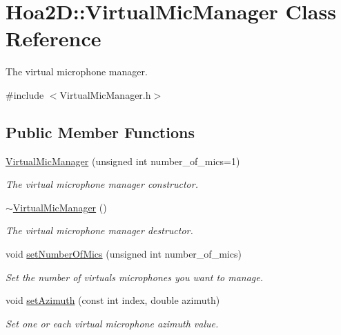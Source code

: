 \hypertarget{class_hoa2_d_1_1_virtual_mic_manager}{\section{Hoa2\-D\-:\-:Virtual\-Mic\-Manager Class Reference}
\label{class_hoa2_d_1_1_virtual_mic_manager}
}


The virtual microphone manager.  




{\ttfamily \#include $<$Virtual\-Mic\-Manager.\-h$>$}

\subsection*{Public Member Functions}
\begin{DoxyCompactItemize}
\item 
\hyperlink{class_hoa2_d_1_1_virtual_mic_manager_a967f0bf89c87a6c94bee641bffece3fa}{Virtual\-Mic\-Manager} (unsigned int number\-\_\-of\-\_\-mics=1)
\begin{DoxyCompactList}\small\item\em The virtual microphone manager constructor. \end{DoxyCompactList}\item 
\hyperlink{class_hoa2_d_1_1_virtual_mic_manager_a52898fb542bcdcf394e05348d27b8398}{$\sim$\-Virtual\-Mic\-Manager} ()
\begin{DoxyCompactList}\small\item\em The virtual microphone manager destructor. \end{DoxyCompactList}\item 
void \hyperlink{class_hoa2_d_1_1_virtual_mic_manager_a9bbd49d515f2dce8e515ef8341321a99}{set\-Number\-Of\-Mics} (unsigned int number\-\_\-of\-\_\-mics)
\begin{DoxyCompactList}\small\item\em Set the number of virtuals microphones you want to manage. \end{DoxyCompactList}\item 
void \hyperlink{class_hoa2_d_1_1_virtual_mic_manager_a087380cb38819e091cb76277b7cfaebb}{set\-Azimuth} (const int index, double azimuth)
\begin{DoxyCompactList}\small\item\em Set one or each virtual microphone azimuth value. \end{DoxyCompactList}\item 

\end{DoxyCompactItemize}
